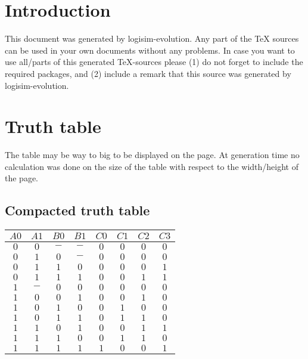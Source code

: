 \documentclass [15pt,a4paper,twoside]{article}
\begin{document}
\section{Introduction}
This document was generated by logisim-evolution. Any part of the TeX sources can be used in your own documents without any problems. In case you want to use all/parts of this generated TeX-sources please (1) do not forget to include the required packages, and (2) include a remark that this source was generated by logisim-evolution.
\section{Truth table}
The table may be way to big to be displayed on the page. At generation time no calculation was done on the size of the table with respect to the width/height of the page.
\subsection{Compacted truth table}
\begin{center}
\begin{tabular}{cccc|cccc}
$A0$&$A1$&$B0$&$B1$&$C0$&$C1$&$C2$&$C3$\\
\hline
$0$&$0$&$-$&$-$&$0$&$0$&$0$&$0$\\
$0$&$1$&$0$&$-$&$0$&$0$&$0$&$0$\\
$0$&$1$&$1$&$0$&$0$&$0$&$0$&$1$\\
$0$&$1$&$1$&$1$&$0$&$0$&$1$&$1$\\
$1$&$-$&$0$&$0$&$0$&$0$&$0$&$0$\\
$1$&$0$&$0$&$1$&$0$&$0$&$1$&$0$\\
$1$&$0$&$1$&$0$&$0$&$1$&$0$&$0$\\
$1$&$0$&$1$&$1$&$0$&$1$&$1$&$0$\\
$1$&$1$&$0$&$1$&$0$&$0$&$1$&$1$\\
$1$&$1$&$1$&$0$&$0$&$1$&$1$&$0$\\
$1$&$1$&$1$&$1$&$1$&$0$&$0$&$1$\\

\end{tabular}
\end{center}
\end{document}
